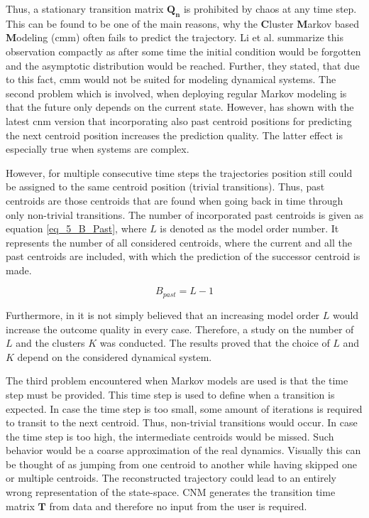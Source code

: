 Thus, a stationary transition matrix $\bm{Q_n}$ is prohibited by chaos at any time step.
This can be found to be one of the main reasons, why 
the  \textbf{C}luster \textbf{M}arkov based \textbf{M}odeling (\gls{cmm}) 
often fails to 
predict the trajectory. 
Li et al. \cite{Li2021} summarize this observation 
compactly as after some time the initial condition 
would be forgotten and the asymptotic distribution would be reached.
Further, they stated, that due to this fact, \gls{cmm} would 
not be suited for modeling dynamical systems. 
The second problem which is involved, when deploying 
regular Markov modeling is that the future only depends
on the current state. However, \cite{Fernex2021} has shown
with the latest \gls{cnm} version that incorporating also past 
centroid positions for predicting the next centroid position 
increases the prediction quality. The latter effect is especially 
true when systems are complex.\newline 


However, for multiple consecutive time steps 
the trajectories position still could be assigned to the same 
centroid position (trivial transitions).
Thus, past centroids are those centroids that are found when going 
back in time through only non-trivial transitions. The number of incorporated 
past centroids is given as equation \eqref{eq_5_B_Past}, where $L$ is denoted 
as the model order number. It represents the number of all 
considered centroids, where the current and all the past centroids are included, with which the prediction of the successor centroid 
is made.

\begin{equation}
    B_{past} = L -1
    \label{eq_5_B_Past}
\end{equation}

Furthermore, in \cite{Fernex2021} it is not simply believed that an 
increasing model 
order $L$ would increase the outcome quality in every case. 
Therefore, a study on the number of $L$ and the clusters $K$
was conducted. The results proved that the choice of 
$L$ and $K$ depend on the considered dynamical system.
\newline

The third problem encountered when Markov models are used is 
that the time step must be provided. This time step is used 
to define when a transition is expected. In case 
the time step is too small, some amount of iterations is 
required to transit to the next centroid. Thus, non-trivial 
transitions would occur. In case the time step is too high, 
the intermediate centroids would be missed. Such behavior
would be a coarse approximation of the real dynamics. Visually this can 
be thought of as jumping from one centroid to another while
having skipped one or multiple centroids. The reconstructed 
trajectory could lead to an entirely wrong representation of the 
state-space.
CNM generates the transition time matrix $\bm T$ from data 
and therefore no input from the user is required.\newline


